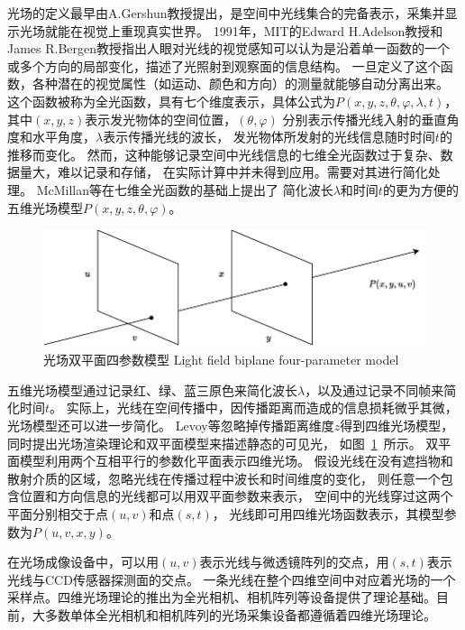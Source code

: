 光场的定义最早由A.Gershun教授提出，是空间中光线集合的完备表示，采集并显示光场就能在视觉上重现真实世界。
1991年，MIT的Edward H.Adelson教授和James R.Bergen教授指出人眼对光线的视觉感知可以认为是沿着单一函数的一个或多个方向的局部变化，描述了光照射到观察面的信息结构。
一旦定义了这个函数，各种潜在的视觉属性（如运动、颜色和方向）的测量就能够自动分离出来。
这个函数被称为全光函数，具有七个维度表示，具体公式为$P(x,y,z,\theta,\varphi,\lambda,t)$，
其中$(x,y,z)$表示发光物体的空间位置，$(\theta,\varphi)$
分别表示传播光线入射的垂直角度和水平角度，$\lambda$表示传播光线的波长，
发光物体所发射的光线信息随时时间$t$的推移而变化。
然而，这种能够记录空间中光线信息的七维全光函数过于复杂、数据量大，难以记录和存储，
在实际计算中并未得到应用。需要对其进行简化处理。
McMillan等在七维全光函数的基础上提出了
简化波长$\lambda$和时间$t$的更为方便的五维光场模型$P(x,y,z,\theta,\varphi)$。
\par
\begin{figure}[b]
	\centering
	\includegraphics[width=0.95\linewidth]{figures/chapter2/double_plane_model.drawio}
	\bicaption
	{光场双平面四参数模型}
	{Light field biplane four-parameter model}  
	\label{chapter2_fig1:double_plane}
\end{figure}
五维光场模型通过记录红、绿、蓝三原色来简化波长$\lambda$，以及通过记录不同帧来简化时间$t$。
实际上，光线在空间传播中，因传播距离而造成的信息损耗微乎其微，光场模型还可以进一步简化。
Levoy等忽略掉传播距离维度$z$得到四维光场模型，
同时提出光场渲染理论和双平面模型来描述静态的可见光，
如图~\ref{chapter2_fig1:double_plane}~所示。
双平面模型利用两个互相平行的参数化平面表示四维光场。
假设光线在没有遮挡物和散射介质的区域，忽略光线在传播过程中波长和时间维度的变化，
则任意一个包含位置和方向信息的光线都可以用双平面参数来表示，
空间中的光线穿过这两个平面分别相交于点$(u, v)$和点$(s, t)$，
光线即可用四维光场函数表示，其模型参数为$P(u, v, x, y)$。
%
%
%
\par
%
%
%
在光场成像设备中，可以用$(u, v)$表示光线与微透镜阵列的交点，用$(s, t)$表示光线与CCD传感器探测面的交点。
一条光线在整个四维空间中对应着光场的一个采样点。四维光场理论的推出为全光相机、相机阵列等设备提供了理论基础。目前，大多数单体全光相机和相机阵列的光场采集设备都遵循着四维光场理论。
%
%





